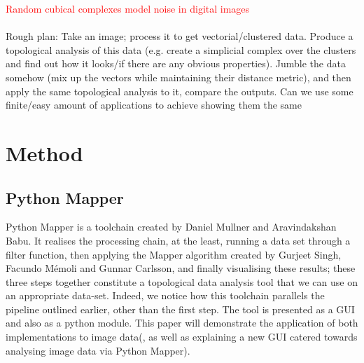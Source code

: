 \documentclass[a4paper]{article}
\begin{document}
\textcolor{red}{Random cubical complexes model noise in digital images}
\\
\\
Rough plan: Take an image; process it to get vectorial/clustered data. Produce a topological analysis of this data (e.g. create a simplicial complex over the clusters and find out how it looks/if there are any obvious properties). Jumble the data somehow (mix up the vectors while maintaining their distance metric), and then apply the same topological analysis to it, compare the outputs. Can we use some finite/easy amount of applications to achieve showing them the same

\section*{Method}

\subsection*{Python Mapper}

Python Mapper is a toolchain created by Daniel Mullner and Aravindakshan Babu. It realises the processing chain, at the least, running a data set through a filter function, then applying the Mapper algorithm created by Gurjeet Singh, Facundo Mémoli and Gunnar Carlsson, and finally visualising these results; these three steps together constitute a topological data analysis tool that we can use on an appropriate data-set. Indeed, we notice how this toolchain parallels the pipeline outlined earlier, other than the first step. The tool is presented as a GUI and also as a python module. This paper will demonstrate the application of both implementations to image data(, as well as explaining a new GUI catered towards analysing image data via Python Mapper). 
\end{document}
